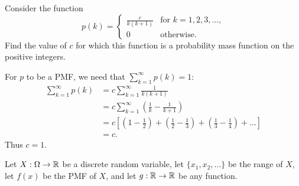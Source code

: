 \begin{exercise}
\begin{questions}
\question
Consider the function
\[
p(k) = \left\{\begin{array}{ll}
	\displaystyle\frac{c}{k(k+1)} & \text{for } k=1,2,3,\ldots, \\[2ex]
	0				& \text{otherwise}.
\end{array}\right.	
\]
Find the value of $c$ for which this function is a probability mass function on the positive integers.%
\par
[\slshape Hint. Use partial fractions and the so-called ``method of differences".\normalfont]
\begin{answer}
For $p$ to be a PMF, we need that $\displaystyle\sum_{k=1}^{\infty} p(k) = 1$:
\begin{align*}
\sum_{k=1}^{\infty} p(k) 
	& = c\sum_{k=1}^{\infty}\frac{1}{k(k+1)} \\
	& = c\sum_{k=1}^{\infty}\left(\frac{1}{k}-\frac{1}{k+1}\right) \\
	& = c\left[\left(1-\frac{1}{2}\right) + \left(\frac{1}{2}-\frac{1}{3}\right) + \left(\frac{1}{3}-\frac{1}{4}\right) + \ldots\right] \\
	& = c.
\end{align*}
Thus $c=1$.
\end{answer}

\question
Let $X:\Omega\to\mathbb{R}$ be a discrete random variable, let $\{x_1,x_2,\ldots\}$ be the range of $X$, let $f(x)$ be the PMF of $X$, and let $g:\mathbb{R}\to\mathbb{R}$ be any function.
\end{questions}
\end{exercise}
